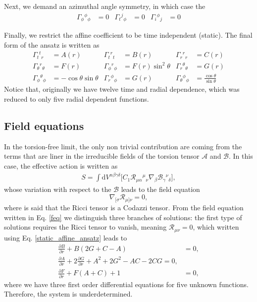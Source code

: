 \documentclass{article}
\providecommand{\ctG}[3]{\Gamma_{#1}{}^{ #2}{}_{#3}}
\begin{document}
Next, we demand an azimuthal angle symmetry, in which case the
\begin{align}
    \ctG{\phi}{\phi}{\phi} & = 0 & \ctG{t}{j}{\phi} & = 0 & \ctG{i}{\phi}{j} & = 0
\end{align}

Finally, we restrict the affine coefficient to be time independent (static). The final form
of the ansatz is written as
\begin{equation}
    \label{static_affine_ansatz}
    \begin{aligned}
        \ctG{t}{t}{r} & = A(r) & \ctG{t}{r}{t} & = B(r) & \ctG{r}{r}{r} & = C(r) \\
        \ctG{\theta}{r}{\theta} & = F(r) & \ctG{\phi}{r}{\phi} & = F(r)\sin^2\theta & \ctG{r}{\theta}{\theta} & = G(r) \\ 
        \ctG{\phi}{\theta}{\phi} & = -\cos\theta\sin\theta & \ctG{r}{\phi}{\phi} & = G(r) & \ctG{\theta}{\phi}{\phi} & = \frac{\cos\theta}{\sin \theta} 
    \end{aligned}
    \end{equation}
Notice that, originally we have twelve time and radial dependence, which was
reduced to only five radial dependent functions. 


\subsection{Field equations}

In the torsion-free limit, the only non trivial contribution are
coming from the terms that are liner in the irreducible fields of 
the torsion tensor $\mathcal{A}$ and $\mathcal{B}$. In this case,
the effective action is written as
\begin{equation}
    \label{PAG_action}
    \begin{split}
    S = \int  \mathrm{d}V^{\alpha \beta \gamma \delta} \bigg[
    C_1 \mathcal{R}_{\mu\alpha}{}^{\mu}{}_{\nu} \nabla_\beta \mathcal{B}_{\gamma}{}^{\nu}{}_{\delta}\bigg],
    \end{split}
\end{equation}
whose variation with respect to the $\mathcal{B}$ leads
to the field equation
\begin{equation}
    \label{feq}
    \nabla_{[\sigma}\mathcal{R}_{\mu]\nu} = 0,
\end{equation}
where is said that the Ricci tensor is a Codazzi tensor. From
the field equation written in Eq. \eqref{feq} we distinguish three
branches of solutions: the first type of solutions requires the
Ricci tensor to vanish, meaning $\mathcal{R}_{\mu\nu} = 0$, which
written using Eq. \eqref{static_affine_ansatz} leads to
\begin{align}
    \frac{\partial B}{\partial r} + B \left(2G + C - A\right) & = 0, \\
    \frac{\partial A}{\partial r} + 2\frac{\partial G}{\partial r} + A^2 + 2G^2 - AC - 2CG = 0, \\
    \frac{\partial F}{\partial r} + F\left(A + C\right) + 1 & = 0, 
\end{align}
where we have three first order differential equations for five
unknown functions. Therefore, the system is underdetermined.
\end{document}
